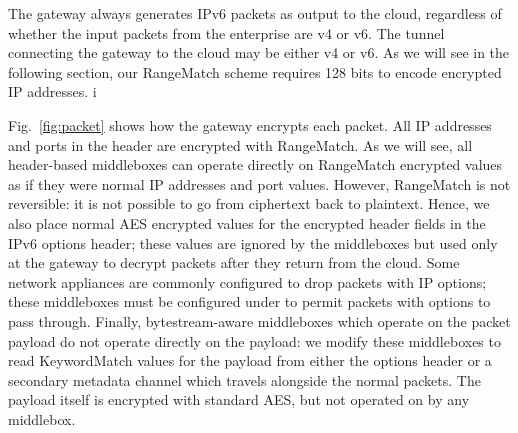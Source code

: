 

The gateway always generates IPv6 packets as output to the cloud, regardless of whether the input packets from the enterprise are v4 or v6. The tunnel connecting the gateway to the cloud may be either v4 or v6.
As we will see in the following section, our RangeMatch scheme requires 128 bits to encode encrypted IP addresses.
i%

Fig.~\ref{fig:packet} shows how the gateway encrypts each packet.
All IP addresses and ports in the header are encrypted with RangeMatch.
As we will see, all header-based middleboxes can operate directly on RangeMatch encrypted values as if they were normal IP addresses and port values.
However, RangeMatch is not reversible: it is not possible to go from ciphertext back to plaintext. Hence, we also place normal AES encrypted values for the encrypted header fields in the IPv6 options header; these values are ignored by the middleboxes but used only at the gateway to decrypt packets after they return from the cloud.
Some network appliances are commonly configured to drop packets with IP options; these middleboxes must be configured under \sys to permit packets with \sys options to pass through.
Finally, bytestream-aware middleboxes which operate on the packet payload do not operate directly on the payload: we modify these middleboxes to read KeywordMatch values for the payload from either the options header or a secondary metadata channel which travels alongside the normal packets.
The payload itself is encrypted with standard AES, but not operated on by any middlebox.

